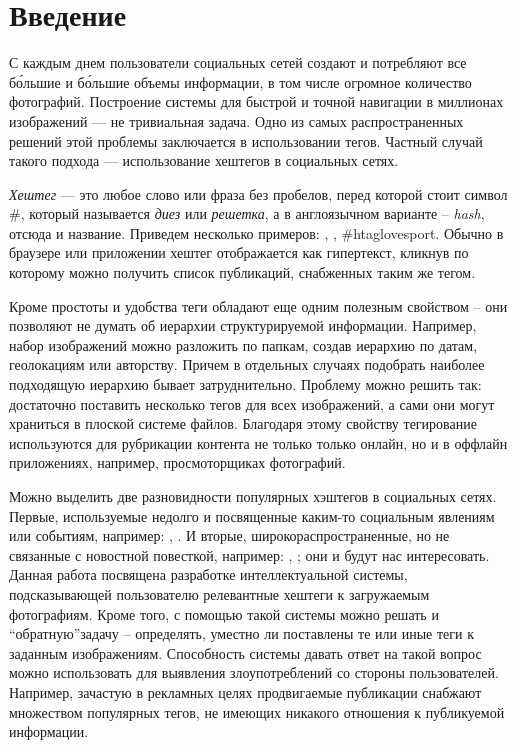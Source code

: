 \section*{Введение}

\indent
\indent
С каждым днем пользователи социальных сетей создают и потребляют все б\'{о}льшие
и б\'{о}льшие объемы информации, в том числе огромное количество фотографий.
Построение системы для быстрой и точной навигации в миллионах изображений
 --- не тривиальная задача. Одно из самых распространенных решений этой
 проблемы заключается в использовании тегов. Частный случай такого подхода ---
 использование хештегов в социальных сетях.


\indent
\textit{Хештег} --- это любое слово или фраза без пробелов, перед которой стоит 
символ \#, который называется \textit{диез} или \textit{решетка}, а в англоязычном 
варианте -- \textit{hash}, отсюда и название. Приведем несколько примеров:
, , \#htag{lovesport}. Обычно в браузере или 
приложении хештег отображается как гипертекст, кликнув по которому можно 
получить список публикаций, снабженных таким же тегом.

\indent
Кроме простоты и удобства теги обладают еще одним полезным свойством 
-- они позволяют не думать об  иерархии структурируемой информации. 
Например, набор изображений можно разложить
по папкам, создав иерархию по датам, геолокациям или авторству. Причем в отдельных
случаях подобрать наиболее подходящую иерархию бывает затруднительно. Проблему
можно решить так: достаточно поставить несколько тегов для всех изображений,
а сами они могут храниться в плоской системе файлов.
Благодаря этому свойству тегирование используются  для рубрикации контента 
не только только онлайн, но и в оффлайн приложениях, например, 
просмоторщиках фотографий. 


\indent
Можно выделить две разновидности популярных хэштегов в социальных сетях.
Первые, используемые недолго и посвященные каким-то социальным явлениям
или событиям, например: , . 
И вторые, широкораспространенные, но не связанные с новостной повесткой, 
например: , ; они и будут нас интересовать.
 Данная работа посвящена разработке интеллектуальной системы, 
подсказывающей пользователю релевантные хештеги к загружаемым фотографиям.
 Кроме того, с помощью такой системы можно решать и 
  \textquotedblleft обратную\textquotedblright  задачу -- определять,
уместно ли поставлены те или иные теги к заданным изображениям. 
Способность системы давать ответ на такой вопрос можно использовать для 
выявления злоупотреблений со стороны пользователей. Например, зачастую
 в рекламных целях продвигаемые публикации снабжают множеством популярных 
 тегов, не имеющих никакого отношения к публикуемой информации.
 
 